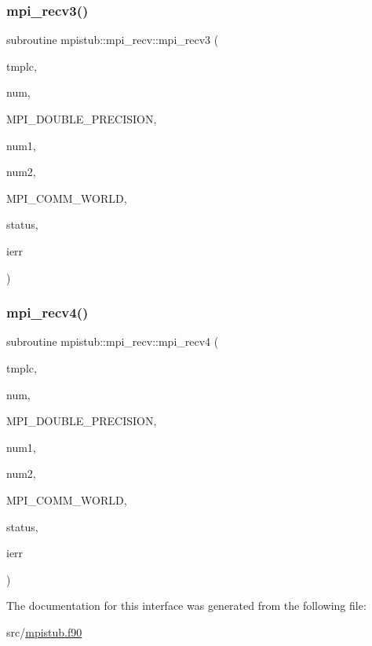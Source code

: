 \subsubsection{\texorpdfstring{mpi\_recv3()}{mpi\_recv3()}}
{\footnotesize\ttfamily subroutine mpistub\+::mpi\+\_\+recv\+::mpi\+\_\+recv3 (\begin{DoxyParamCaption}\item[{double precision, dimension(\+:)}]{tmplc,  }\item[{}]{num,  }\item[{}]{M\+P\+I\+\_\+\+D\+O\+U\+B\+L\+E\+\_\+\+P\+R\+E\+C\+I\+S\+I\+ON,  }\item[{}]{num1,  }\item[{}]{num2,  }\item[{}]{M\+P\+I\+\_\+\+C\+O\+M\+M\+\_\+\+W\+O\+R\+LD,  }\item[{integer, dimension(\+:)}]{status,  }\item[{}]{ierr }\end{DoxyParamCaption})}

\mbox{\label{interfacempistub_1_1mpi__recv_afcc33e8f27f82840249749be728fe594}} 
\subsubsection{\texorpdfstring{mpi\_recv4()}{mpi\_recv4()}}
{\footnotesize\ttfamily subroutine mpistub\+::mpi\+\_\+recv\+::mpi\+\_\+recv4 (\begin{DoxyParamCaption}\item[{integer, dimension(\+:)}]{tmplc,  }\item[{}]{num,  }\item[{}]{M\+P\+I\+\_\+\+D\+O\+U\+B\+L\+E\+\_\+\+P\+R\+E\+C\+I\+S\+I\+ON,  }\item[{}]{num1,  }\item[{}]{num2,  }\item[{}]{M\+P\+I\+\_\+\+C\+O\+M\+M\+\_\+\+W\+O\+R\+LD,  }\item[{integer, dimension(\+:)}]{status,  }\item[{}]{ierr }\end{DoxyParamCaption})}



The documentation for this interface was generated from the following file\+:\begin{DoxyCompactItemize}
\item 
src/\mbox{\hyperlink{mpistub_8f90}{mpistub.\+f90}}\end{DoxyCompactItemize}
